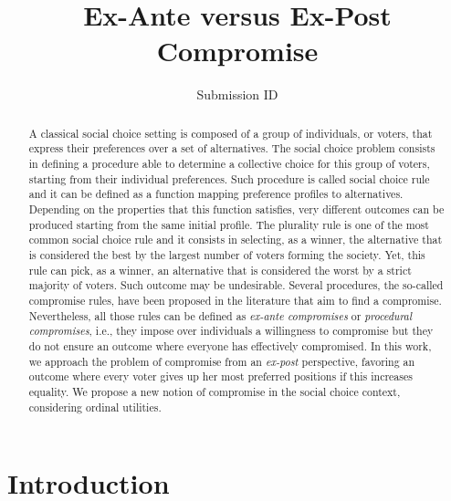 \documentclass[version=3.21, pagesize, twoside=off, bibliography=totoc, DIV=calc, fontsize=12pt, a4paper]{scrartcl}
\title{Ex-Ante versus Ex-Post Compromise}
\author{Submission ID}
\begin{document}
\maketitle

\begin{abstract}
	A classical social choice setting is composed of a group of individuals, or voters, that express their preferences over a set of alternatives. The social choice problem consists in defining a procedure able to determine a collective choice for this group of voters, starting from their individual preferences. Such procedure is called social choice rule and it can be defined as a function mapping preference profiles to alternatives. Depending on the properties that this function satisfies, very different outcomes can be produced starting from the same initial profile. The plurality rule is one of the most common social choice rule and it consists in selecting, as a winner, the alternative that is considered the best by the largest number of voters forming the society. Yet, this rule can pick, as a winner, an alternative that is considered the worst by a strict majority of voters. Such outcome may be undesirable. Several procedures, the so-called compromise rules, have been proposed in the literature that aim to find a compromise. Nevertheless, all those rules can be defined as \emph{ex-ante compromises} or \emph{procedural compromises}, i.e., they impose over individuals a willingness to compromise but they do not ensure an outcome where everyone has effectively compromised. In this work, we approach the problem of compromise from an \emph{ex-post} perspective, favoring an outcome where every voter gives up her most preferred positions if this increases equality. We propose a new notion of compromise in the social choice context, considering ordinal utilities.
\end{abstract}

\section{Introduction}
\label{sec:introduction}
\end{document}
